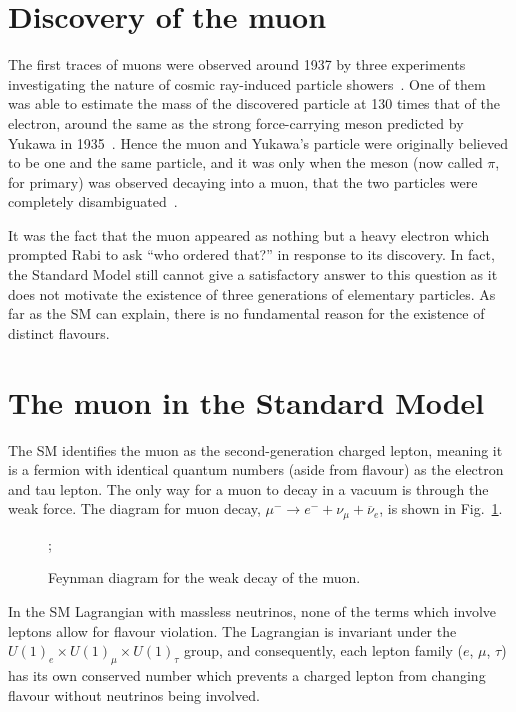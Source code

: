 \section{Discovery of the muon}
The first traces of muons were observed around 1937 by three experiments
investigating the nature of cosmic ray-induced particle
showers~\cite{PhysRev.51.884, PhysRev.52.1198, PhysRev.52.1003}. 
One of them was able to estimate the mass of the discovered
particle at 130 times that of the electron, around the same as the strong
force-carrying meson predicted by Yukawa in 1935~\cite{10.1143/PTPS.1.1}. 
Hence the muon and Yukawa's particle were
originally believed to be one and the same particle, and it was only when
the meson (now called $\pi$, for primary) was observed decaying into a muon,
that the two particles were completely disambiguated~\cite{LATTES1947}.

It was the fact that the muon appeared as nothing but a heavy electron which
prompted Rabi to ask ``who ordered that?'' in response to its discovery. In
fact, the Standard Model still cannot give a satisfactory answer to this
question as it does not motivate the existence of three generations of
elementary particles. As far as the SM can explain, there is no fundamental reason
for the existence of distinct flavours.

\section{The muon in the Standard Model}
% 
The SM identifies the muon as the second-generation charged lepton, meaning it
is a fermion with identical quantum numbers (aside from flavour) as the electron
and tau lepton. The only way for a muon to decay in a vacuum is through the weak
force. The diagram for muon decay, $\mu^- \rightarrow e^- +  \nu_\mu
+ \overline{\nu}_e$, is shown in Fig.~\ref{fig:weak_decay}.


\begin{figure}
    \centering
    ;
    \caption{Feynman diagram for the weak decay of the muon.}
    \label{fig:weak_decay}
\end{figure}

In the SM Lagrangian with massless neutrinos, none of the terms which involve
leptons allow for flavour violation. The Lagrangian is invariant under the
$U(1)_e \times U(1)_\mu \times U(1)_\tau$ group, and consequently, each lepton
family ($e$, $\mu$, $\tau$) has its own conserved number which prevents a
charged lepton from changing flavour without neutrinos being involved. 

